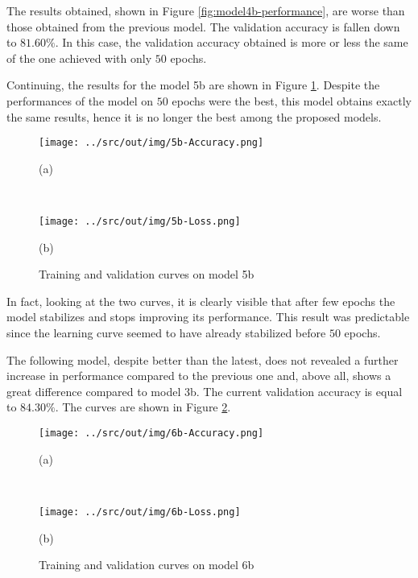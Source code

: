 \documentclass[a4paper,12pt]{article} %
\begin{document}
	The results obtained, shown in Figure \ref{fig:model4b-performance}, are 
	worse than those obtained from the previous model. The validation accuracy 
	is fallen down to $81.60\%$. In this case, the validation accuracy obtained 
	is more or less the same of the one achieved with only $50$ epochs.
	\newline
	
	Continuing, the results for the model 5b are shown in Figure 
	\ref{fig:model5b-performance}. Despite the performances of the model on 
	$50$ epochs were the best, this model obtains exactly the same results, 
	hence it is no longer the best among the proposed models. 
	
	\begin{figure}[htb]
		\begin{minipage}[c]{.49\textwidth}
			\centering
			\texttt{[image: ../src/out/img/5b-Accuracy.png]}
			\caption*{(a)}
		\end{minipage}
		~
		\begin{minipage}[c]{.49\textwidth}
			\centering
			\texttt{[image: ../src/out/img/5b-Loss.png]}
			\caption*{(b)}
		\end{minipage}
		\caption{Training and validation curves on model 5b}
		\label{fig:model5b-performance}
	\end{figure}

	In fact, looking at the two curves, it is clearly visible that after few 
	epochs the model stabilizes and stops improving its performance.
	This result was predictable since the learning curve seemed to have already 
	stabilized before $50$ epochs.
	\newline
	
	The following model, despite better than the latest, does not revealed a 
	further increase in performance compared to the previous one and, above 
	all, shows a great difference compared to model 3b. The current validation 
	accuracy is equal to $84.30\%$. The curves are shown in Figure 
	\ref{fig:model6b-performance}.
	
	\begin{figure}[htb]
		\begin{minipage}[c]{.49\textwidth}
			\centering
			\texttt{[image: ../src/out/img/6b-Accuracy.png]}
			\caption*{(a)}
		\end{minipage}
		~
		\begin{minipage}[c]{.49\textwidth}
			\centering
			\texttt{[image: ../src/out/img/6b-Loss.png]}
			\caption*{(b)}
		\end{minipage}
		\caption{Training and validation curves on model 6b}
		\label{fig:model6b-performance}
	\end{figure}
\end{document}

